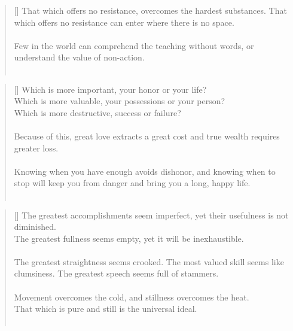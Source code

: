 \documentclass{article}
\begin{document}
\settowidth{\versewidth}{The Wizard leads byemptying people’s minds, filling their bellies, weakening their am- bitions, and making them become strong}
\begin{verse}[\versewidth]
That which offers no resistance, overcomes the hardest substances. 
That which offers no resistance can enter where there is no space.\\
\hfill\\
Few in the world can comprehend the teaching without words, or understand the value of non-action.\\
\hfill\\
\end{verse}

\settowidth{\versewidth}{The Wizard leads byemptying people’s minds, filling their bellies, weakening their am- bitions, and making them become strong}
\begin{verse}[\versewidth]
Which is more important, your honor or your life?\\
Which is more valuable, your possessions or your person?\\
Which is more destructive, success or failure?\\
\hfill\\
Because of this, great love extracts a great cost and true wealth requires greater loss.\\
\hfill\\
Knowing when you have enough avoids dishonor, and knowing when to stop will keep you from danger
and bring you a long, happy life.\\
\hfill\\
\end{verse}

\settowidth{\versewidth}{The Wizard leads byemptying people’s minds, filling their bellies, weakening their am- bitions, and making them become strong}
\begin{verse}[\versewidth]
The greatest accomplishments seem imperfect, yet their usefulness is not diminished.\\
The greatest fullness seems empty, yet it will be inexhaustible.\\
\hfill\\
The greatest straightness seems crooked. 
The most valued skill seems like clumsiness. 
The greatest speech seems full of stammers.\\
\hfill\\
Movement overcomes the cold, and stillness overcomes the heat.\\
That which is pure and still is the universal ideal.\\
\hfill\\
\end{verse}
\end{document}
